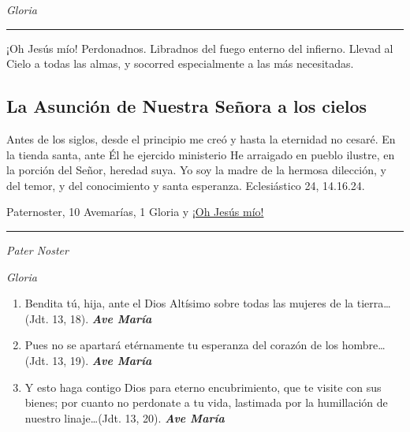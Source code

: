 \documentclass[a4paper,11pt, oneside]{report}
\begin{document}
{{\begin{enumerate}
      \end{enumerate}      

      \indent\textit{Gloria} \par      

      \begin{center}\rule{1\linewidth}{\linethickness}\end{center}      

      \medskip
      \hypertarget{finalPentecostes}{¡Oh Jesús mío! Perdonadnos. Libradnos del fuego enterno del infierno. Llevad al Cielo a todas las almas, y socorred especialmente a las más 
      necesitadas.}
    }

  \subsection*{La Asunción de Nuestra Señora a los cielos}
    {
      Antes de los siglos, desde el principio me creó y hasta la eternidad no cesaré. En la tienda santa, ante Él he ejercido ministerio
      He arraigado en pueblo ilustre, en la porción del Señor, heredad suya. Yo soy la madre de la hermosa dilección, y del temor, y del
      conocimiento y santa esperanza. Eclesiástico 24, 14.16.24.

       Paternoster, 10 Avemarías, 1 Gloria y \hyperlink{finalAsuncion}{¡Oh Jesús mío!}

      \begin{center}\rule{1\linewidth}{\linethickness}\end{center}

      \medskip
      \textit{Pater Noster}

      \indent\textit{Gloria} \par

      \begin{enumerate}

        \item Bendita tú, hija, ante el Dios Altísimo sobre todas las mujeres de la tierra\ldots (Jdt. 13, 18). \textbf{\textit{Ave María}}

        \item Pues no se apartará etérnamente tu esperanza del corazón de los hombre\ldots (Jdt. 13, 19). \textbf{\textit{Ave María}}

        \item Y esto haga contigo Dios para eterno encubrimiento, que te visite con sus bienes; por cuanto no perdonate
        a tu vida, lastimada por la humillación de nuestro linaje\ldots (Jdt. 13, 20). \textbf{\textit{Ave María}}


\end{enumerate}}}
\end{document}
